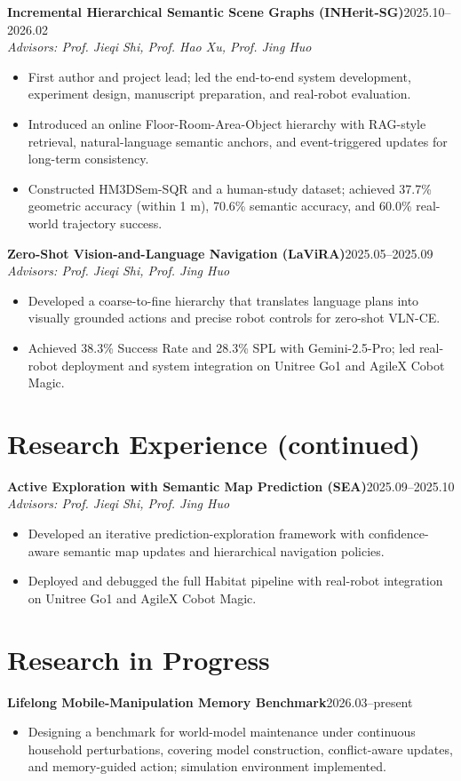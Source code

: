 \documentclass[11pt,a4paper]{article}
\newcommand{\project}[2]{\textbf{#1}\hfill #2\\[-1pt]}
\newcommand{\advisors}[1]{\textit{Advisors: #1}\\[-2pt]}
\begin{document}
\project{Incremental Hierarchical Semantic Scene Graphs (INHerit-SG)}{2025.10--2026.02}
\advisors{Prof. Jieqi Shi, Prof. Hao Xu, Prof. Jing Huo}
\begin{itemize}
  \item First author and project lead; led the end-to-end system development, experiment design, manuscript preparation, and real-robot evaluation.
  \item Introduced an online Floor-Room-Area-Object hierarchy with RAG-style retrieval, natural-language semantic anchors, and event-triggered updates for long-term consistency.
  \item Constructed HM3DSem-SQR and a human-study dataset; achieved 37.7\% geometric accuracy (within 1 m), 70.6\% semantic accuracy, and 60.0\% real-world trajectory success.
\end{itemize}

\project{Zero-Shot Vision-and-Language Navigation (LaViRA)}{2025.05--2025.09}
\advisors{Prof. Jieqi Shi, Prof. Jing Huo}
\begin{itemize}
  \item Developed a coarse-to-fine hierarchy that translates language plans into visually grounded actions and precise robot controls for zero-shot VLN-CE.
  \item Achieved 38.3\% Success Rate and 28.3\% SPL with Gemini-2.5-Pro; led real-robot deployment and system integration on Unitree Go1 and AgileX Cobot Magic.
\end{itemize}

\newpage
\section{Research Experience (continued)}

\project{Active Exploration with Semantic Map Prediction (SEA)}{2025.09--2025.10}
\advisors{Prof. Jieqi Shi, Prof. Jing Huo}
\begin{itemize}
  \item Developed an iterative prediction-exploration framework with confidence-aware semantic map updates and hierarchical navigation policies.
  \item Deployed and debugged the full Habitat pipeline with real-robot integration on Unitree Go1 and AgileX Cobot Magic.
\end{itemize}

\section{Research in Progress}
\project{Lifelong Mobile-Manipulation Memory Benchmark}{2026.03--present}
\begin{itemize}
  \item Designing a benchmark for world-model maintenance under continuous household perturbations, covering model construction, conflict-aware updates, and memory-guided action; simulation environment implemented.
\end{itemize}
\end{document}
